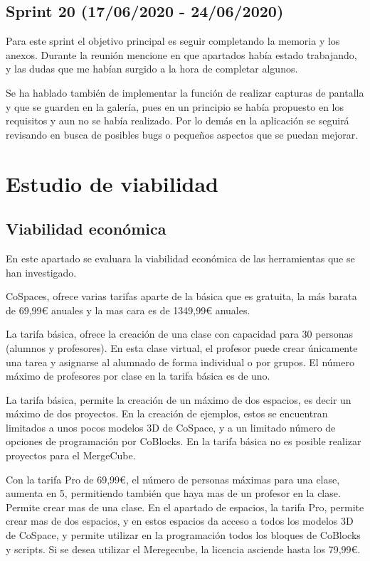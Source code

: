  \subsection{Sprint 20 (17/06/2020 - 24/06/2020)}
 Para este sprint el objetivo principal es seguir completando la memoria y los anexos. Durante la reunión mencione en que apartados había estado trabajando, y las dudas que me habían surgido a la hora de completar algunos.
 
 Se ha hablado también de implementar la función de realizar capturas de pantalla y que se guarden en la galería, pues en un principio se había propuesto en los requisitos y aun no se había realizado. Por lo demás en la aplicación se seguirá revisando en busca de posibles bugs o pequeños aspectos que se puedan mejorar. 
 
\section{Estudio de viabilidad}

\subsection{Viabilidad económica}

En este apartado se evaluara la viabilidad económica de las herramientas que se han investigado.


CoSpaces, ofrece varias tarifas aparte de la básica que es gratuita, la más barata de 69,99\euro{}  anuales y la mas cara es de 1349,99\euro{} anuales.

La tarifa básica, ofrece la creación de una clase con capacidad para 30 personas (alumnos y profesores). En esta clase virtual, el profesor puede crear únicamente una tarea y asignarse al alumnado de forma individual o por grupos. El número máximo de profesores por clase en la tarifa básica es de uno.

La tarifa básica, permite la creación de un máximo de dos espacios, es decir un máximo de dos proyectos. En la creación de ejemplos, estos se encuentran limitados a unos pocos modelos 3D de CoSpace, y a un limitado número de opciones de programación por CoBlocks. En la tarifa básica no es posible realizar proyectos para el MergeCube.

Con la tarifa Pro de 69,99\euro{}, el número de personas máximas para una clase, aumenta en 5, permitiendo también que haya mas de un profesor en la clase. Permite crear mas de una clase. En el apartado de espacios, la tarifa Pro, permite crear mas de dos espacios, y en estos espacios da acceso a todos los modelos 3D de CoSpace, y permite utilizar en la programación todos los bloques de CoBlocks y scripts.
Si se desea utilizar el Meregecube, la licencia asciende hasta los 79,99\euro{}. 

